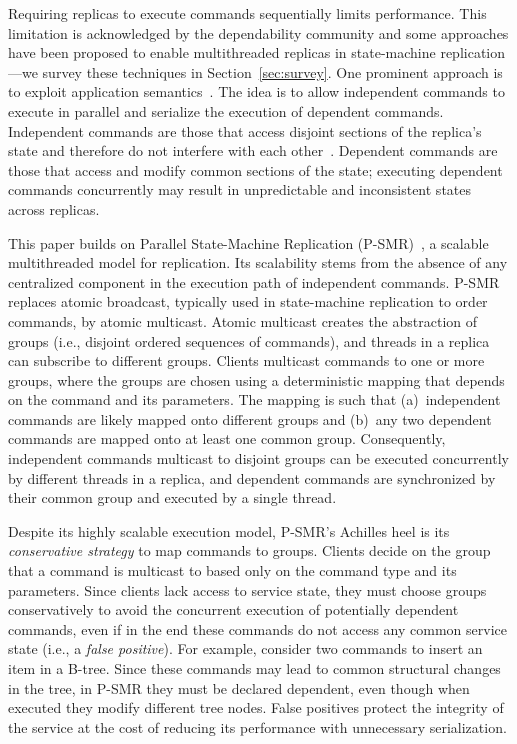 \documentclass[conference]{IEEEtran}
\begin{document}
Requiring replicas to execute commands sequentially limits performance.
This limitation is acknowledged by the dependability community and some approaches have been proposed to enable multithreaded replicas in state-machine replication---we survey these techniques in Section~\ref{sec:survey}.
One prominent approach is to exploit application semantics~\cite{KD2004,KWQCAD2012,p-smr}. 
The idea is to allow independent commands to execute in parallel and serialize the execution of dependent commands. 
Independent commands are those that access disjoint sections of the replica's state and therefore do not interfere with each other~\cite{Sch90}. 
Dependent commands are those that access and modify common sections of the state; executing dependent commands concurrently may result in unpredictable and inconsistent states across replicas.

This paper builds on Parallel State-Machine Replication (P-SMR)~\cite{p-smr}, a scalable multithreaded model for replication. 
Its scalability stems from the absence of any centralized component in the execution path of independent commands.
P-SMR replaces atomic broadcast, typically used in state-machine replication to order commands, by atomic multicast.
Atomic multicast creates the abstraction of groups (i.e., disjoint ordered sequences of commands), and threads in a replica can subscribe to different groups.
Clients multicast commands to one or more groups, where the groups are chosen using a deterministic mapping that depends on the command and its parameters.
The mapping is such that (a)~independent commands are likely mapped onto different groups and (b)~any two dependent commands are mapped onto at least one common group.
Consequently, independent commands multicast to disjoint groups can be executed concurrently by different threads in a replica, and dependent commands are synchronized by their common group and executed by a single thread.

Despite its highly scalable execution model, P-SMR's Achilles heel is its \emph{conservative strategy} to map commands to groups. 
Clients decide on the group that a command is multicast to based only on the command type and its parameters.
Since clients lack access to service state, they must choose groups conservatively to avoid the concurrent execution of potentially dependent commands, even if in the end these commands do not access any common service state (i.e., a \emph{false positive}).
For example, consider two commands to insert an item in a B-tree.
Since these commands may lead to common structural changes in the tree, in P-SMR they must be declared dependent, even though when executed they modify different tree nodes.
False positives protect the integrity of the service at the cost of reducing its performance with unnecessary serialization. 
\end{document}
